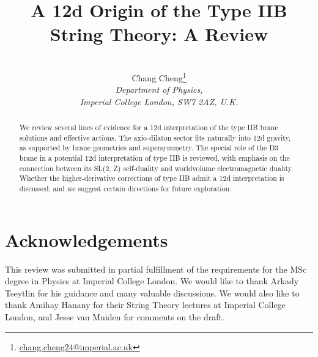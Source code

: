 \documentclass[11pt]{article}
\title{A 12d Origin of the Type IIB String Theory: A Review}
\author{
\\[2pt]
\large{Chang Cheng}\footnote{\href{mailto:chang.cheng24@imperial.ac.uk}{chang.cheng24@imperial.ac.uk}} 
\\[10pt]
\it{Department of Physics,}\\
\it{Imperial College London, SW7 2AZ, U.K.}
\\[2pt]
}
\date{}
\begin{document}
\maketitle



\begin{abstract}
We review several lines of evidence for a 12d interpretation of the type IIB brane solutions and effective actions.
The axio-dilaton sector fits naturally into 12d gravity, as supported by brane geometries and supersymmetry.
The special role of the D3 brane in a potential 12d interpretation of type IIB is reviewed, with emphasis on the connection between its SL(2, Z) self-duality and worldvolume electromagnetic duality.
Whether the higher-derivative corrections of type IIB admit a 12d interpretation is discussed, and we suggest certain directions for future exploration.
\end{abstract}
\tableofcontents










\section{Acknowledgements}
This review was submitted in partial fulfillment of the requirements for the MSc degree in Physics at Imperial College London.
We would like to thank Arkady Tseytlin for his guidance and many valuable discussions.
{\color{orange}We would also like to thank Amihay Hanany for their String Theory lectures at Imperial College London, and Jesse van Muiden for comments on the draft. }

\newpage
\appendix
% 










\end{document}
